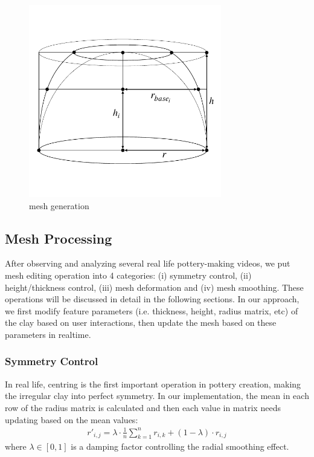 \begin{figure}
  \includegraphics[width=0.75\textwidth]{f1.pdf}
\caption{mesh generation}
\label{fig:1}       %
\end{figure}

\subsection{Mesh Processing}
\label{sec:4.2}
After observing and analyzing several real life pottery-making videos, we put mesh editing operation into 4 categories: (i) symmetry control, (ii) height/thickness control, (iii) mesh deformation and (iv) mesh smoothing. These operations will be discussed in detail in the following sections.
In our approach, we first modify feature parameters (i.e. thickness, height, radius matrix, etc) of the clay based on user interactions, then update the mesh based on these parameters in realtime.

\subsubsection{Symmetry Control}
\label{sec:4.2.1}
In real life, centring is the first important operation in pottery creation, making the irregular clay into perfect symmetry.
In our implementation, the mean in each row of the radius matrix is calculated and then each value in matrix needs updating based on the mean values:
\begin{equation}
\begin{split}
r'_{i,j} = 
\lambda \cdot \frac{1}{n}\sum_{k=1}^{n} r_{i,k}
+ (1 - \lambda) \cdot r_{i,j}
\end{split}
\end{equation}
where $\lambda \in [0,1]$ is a damping factor controlling the radial smoothing effect.

